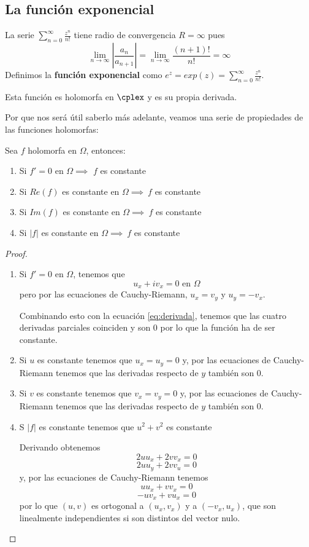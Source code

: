 \documentclass{apuntes}
\begin{document}
\subsection{La función exponencial}
\begin{defn}
La serie $\sum_{n=0}^{\infty}\frac{z^n}{n!}$ tiene radio de convergencia $R=\infty$ pues
\[\lim_{n \to \infty}\left| \frac{a_n}{a_{n+1}}\right| = \lim_{n \to \infty} \frac{(n+1)!}{n!} = \infty\]
Definimos la \textbf{función exponencial} como $e^z=exp(z)=\sum_{n=0}^{\infty}\frac{z^n}{n!}$.

Esta función es holomorfa en $\cplex$ y es su propia derivada.
\end{defn}

Por que nos será útil saberlo más adelante, veamos una serie de propiedades de las funciones holomorfas:
\begin{prop}
Sea $f$ holomorfa en $\Omega$, entonces:
\begin{enumerate}
\item Si $f'=0$ en $\Omega \implies $ $f$ es constante
\item Si $Re(f)$ es constante en $\Omega \implies \ f$ es constante
\item Si $Im(f)$ es constante en $\Omega \implies \ f$ es constante
\item Si $|f|$ es constante en $\Omega \implies \ f$ es constante
\end{enumerate}
\end{prop}
\begin{proof}
\begin{enumerate}
\item Si $f'=0$ en $\Omega$, tenemos que
\begin{equation}\label{eq:derivada}
u_x+iv_x = 0 \text{ en }\Omega
\end{equation}
pero por las ecuaciones de Cauchy-Riemann, $u_x=v_y$ y $u_y=-v_x$.

Combinando esto con la ecuación \eqref{eq:derivada}, tenemos que las cuatro derivadas parciales coinciden y son 0 por lo que la función ha de ser constante.

\item Si $u$ es constante tenemos que $u_x=u_y=0$ y, por las ecuaciones de Cauchy-Riemann tenemos que las derivadas respecto de $y$ también son 0.

\item Si $v$ es constante tenemos que $v_x=v_y=0$ y, por las ecuaciones de Cauchy-Riemann tenemos que las derivadas respecto de $y$ también son 0.

\item S $|f|$ es constante tenemos que $u^2+v^2$ es constante

Derivando obtenemos
\[2uu_x+2vv_x=0\]
\[2uu_y+2vv_u=0\]
y, por las ecuaciones de Cauchy-Riemann tenemos
\[uu_x+vv_x =0\]
\[-uv_x+vu_x = 0\]
por lo que $(u,v)$ es ortogonal a $(u_x,v_x)$ y a $(-v_x,u_x)$, que son linealmente independientes si son distintos del vector nulo.

\end{enumerate}
\end{proof}
\end{document}
